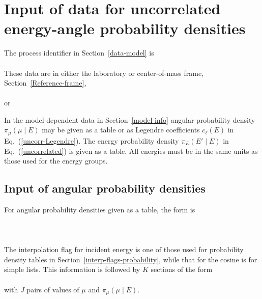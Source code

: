 \section{Input of data for uncorrelated energy-angle probability densities}
The process identifier in Section~\ref{data-model} is\\
  \\
These data are in either the laboratory or center-of-mass frame, 
Section~\ref{Reference-frame},\\
  \\
or\\

In the model-dependent data in Section~\ref{model-info}
angular probability density $\pi_\mu(\mu   \mid E)$ may be given as
a table or as Legendre coefficients $c_\ell(E)$ in Eq.~(\ref{uncorr-Legendre}).
The energy 
probability density $\pi_E(E'   \mid E)$ in
Eq.~(\ref{uncorrelated}) is given as a table.  All energies must be in the same units as
those used for the energy groups.

\subsection{Input of angular probability densities}
For angular probability densities given as a table, the form is\\
  \\
  \\
  \\
The interpolation flag for incident energy is one of those used for
probability density tables in Section~\ref{interp-flags-probability}, while that for
the cosine is for simple lists.  This information is followed
by $K$ sections of the form\\
  \\
with $J$ pairs of values of $\mu$ and $\pi_\mu(\mu   \mid E)$.

